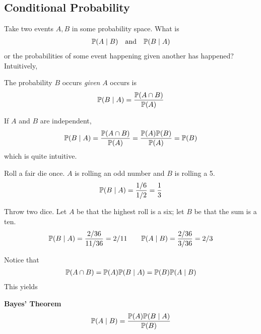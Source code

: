 \subsection{Conditional Probability}
Take two events $A, B$ in some probability space. What is
\begin{align}
    \probability(A \mid B) \qand \probability(B \mid A)
\end{align}
or the probabilities of some event happening given another has happened? Intuitively,
\begin{definition}
    The probability $B$ occurs \textit{given} $A$ occurs is
    \begin{align}
        \mathbb{P}(B \mid A) = \dfrac{\mathbb{P}(A \cap B)}{\mathbb{P}(A)}
    \end{align}
\end{definition}
\begin{lemma}
    If $A$ and $B$ are independent,
    \begin{align}
        \mathbb{P}(B \mid A) = \dfrac{\mathbb{P}(A \cap B)}{\mathbb{P}(A)} = \dfrac{\mathbb{P}(A) \mathbb{P}(B)}{\mathbb{P}(A)} = \mathbb{P}(B)
    \end{align}
    which is quite intuitive.
\end{lemma}
\begin{example}
    Roll a fair die once. $A$ is rolling an odd number and $B$ is rolling a 5.
    \begin{align}
        \mathbb{P}(B \mid A) = \dfrac{1/6}{1/2} = \dfrac{1}{3}
    \end{align}
\end{example}
\begin{example}
    Throw two dice. Let $A$ be that the highest roll is a six; let $B$ be that the sum is a ten.
    \begin{align}
        \probability(B \mid A) = \dfrac{2/36}{11/36} = 2/11 \qsp \probability(A \mid B) = \dfrac{2/36}{3/36} = 2/3
    \end{align}
\end{example}
\noindent Notice that
\begin{align}
    \mathbb{P}(A \cap B) = \mathbb{P}(A) \mathbb{P}(B \mid A) = \mathbb{P}(B) \mathbb{P}(A \mid B)
\end{align}
This yields
\begin{theorem}
    \textbf{Bayes' Theorem}
    \begin{align}
        \mathbb{P}(A \mid B) = \dfrac{\mathbb{P}(A) \mathbb{P}(B \mid A)}{\mathbb{P}(B)}
    \end{align}
\end{theorem}
